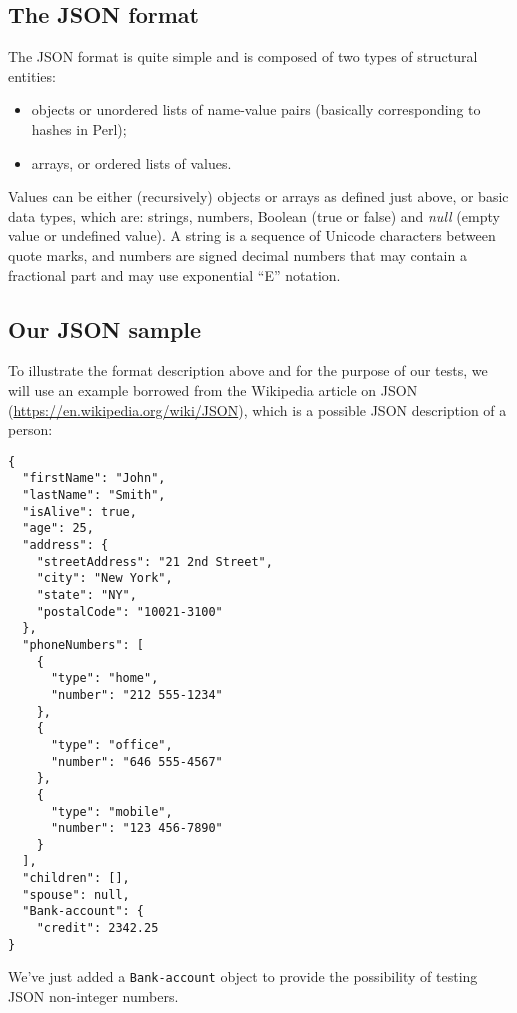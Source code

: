 \subsection{The JSON format}

The JSON format is quite simple and is composed of two types 
of structural entities:
\begin{itemize}
\item objects or unordered lists of name-value pairs 
(basically corresponding to hashes in Perl);
\item arrays, or ordered lists of values.
\end{itemize}

Values can be either (recursively) objects or arrays 
as defined just above, or basic data types, which are: 
strings, numbers, Boolean (true or false) and \emph{null} 
(empty value or undefined value). A string is a sequence 
of Unicode characters between quote marks, and numbers 
are signed decimal numbers that may contain a fractional 
part and may use exponential ``E'' notation.

\subsection{Our JSON sample}

To illustrate the format description above and for the 
purpose of our tests, we will use an example borrowed from 
the Wikipedia article on JSON 
(\url{https://en.wikipedia.org/wiki/JSON}), which is a 
possible JSON description of a person:

\begin{verbatim}
{
  "firstName": "John",
  "lastName": "Smith",
  "isAlive": true,
  "age": 25,
  "address": {
    "streetAddress": "21 2nd Street",
    "city": "New York",
    "state": "NY",
    "postalCode": "10021-3100"
  },
  "phoneNumbers": [
    {
      "type": "home",
      "number": "212 555-1234"
    },
    {
      "type": "office",
      "number": "646 555-4567"
    },
    {
      "type": "mobile",
      "number": "123 456-7890"
    }
  ],
  "children": [],
  "spouse": null,  
  "Bank-account": {
    "credit": 2342.25
}
\end{verbatim}

We've just added a {\tt Bank-account} object to provide the 
possibility of testing JSON non-integer numbers.
 
